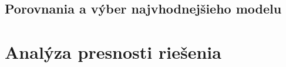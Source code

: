 \subsection{Porovnania a výber najvhodnejšieho modelu}

\section{Analýza presnosti riešenia}
\subsection{}









  

